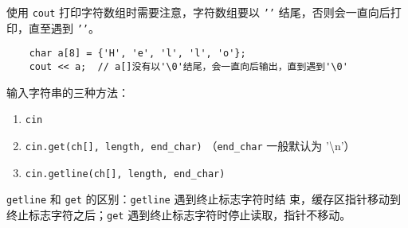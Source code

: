 \documentclass[UTF8]{ctexart}
\begin{document}
使用 \texttt{cout} 打印字符数组时需要注意，字符数组要以 \texttt{'\0'} 结尾，否则会一直向后打
印，直至遇到 \texttt{'\0'}。
\begin{verbatim}
    char a[8] = {'H', 'e', 'l', 'l', 'o'};
    cout << a;  // a[]没有以'\0'结尾，会一直向后输出，直到遇到'\0'
\end{verbatim}

输入字符串的三种方法：
\begin{enumerate}
    \item \texttt{cin}
    \item \texttt{cin.get(ch[], length, end_char)}  （\texttt{end\_char} 一般默认为
    '\textbackslash n'）
    \item \texttt{cin.getline(ch[], length, end_char)}
\end{enumerate}

\texttt{getline} 和 \texttt{get} 的区别：\texttt{getline} 遇到终止标志字符时结
束，缓存区指针移动到终止标志字符之后；\texttt{get} 遇到终止标志字符时停止读取，指针不移动。
\end{document}
